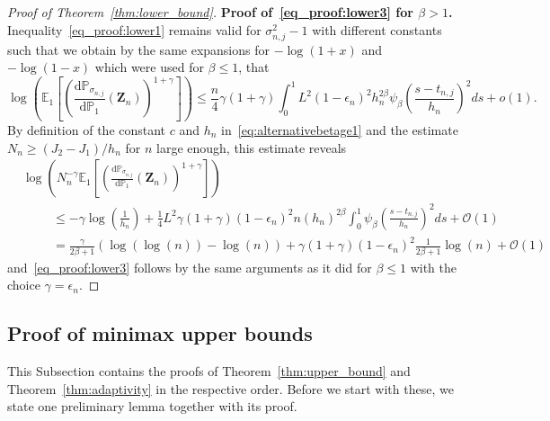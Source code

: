 \documentclass[10.5pt,letter]{article}
\numberwithin{equation}{section}
\theoremstyle{definition}
\newcommand{\E}{\mathbb{E}}
\renewcommand{\P}{\mathbb{P}}
\newcommand{\1}{\mathbbm{1}}
\begin{document}
\begin{proof}[Proof of Theorem~\ref{thm:lower_bound}]
\textbf{Proof of~\eqref{eq_proof:lower3} for $\beta> 1$.}
Inequality~\eqref{eq_proof:lower1} remains valid for $\sigma_{n,j}^2-1$ with different constants such that we obtain by the same expansions for $-\log(1+x)$ and $-\log(1-x)$ which were used for $\beta\leq 1$, that
\[ \log\left( \E_1 \left[\left(\frac{\textrm{d}\P_{\sigma_{n,j}}}{\textrm{d}\P_1}(\mathbf{Z}_n)\right)^{1+\gamma}\right] \right) \leq \frac{n}{4} \gamma(1+\gamma) \int_0^1 L^2(1-\epsilon_n)^2h_n^{2\beta}\psi_{\beta}\left(\frac{s-t_{n,j}}{h_n}\right)^2ds + o(1).\]
By definition of the constant $c$ and $h_n$ in~\eqref{eq:alternativebetage1} and the estimate $N_n\geq (J_2-J_1)/h_n$ for $n$ large enough, this estimate reveals
\begin{align*}
    &\log\left( N_n^{-\gamma}\E_1 \left[\left(\frac{\textrm{d}\P_{\sigma_{n,j}}}{\textrm{d}\P_1}(\mathbf{Z}_n)\right)^{1+\gamma}\right] \right)\\
     &\hspace{1cm}\leq -\gamma\log\left(\frac{1}{h_n}\right) + \frac14 L^2 \gamma(1+\gamma)(1-\epsilon_n)^2 n(h_n)^{2\beta} \int_0^1 \psi_\beta\left( \frac{s-t_{n,j}}{h_n}\right)^2 ds + \mathcal{O}(1)\\
    &\hspace{1cm} = \frac{\gamma}{2\beta+1}\left( \log(\log(n)) - \log(n)\right) + \gamma(1+\gamma)(1-\epsilon_n)^2 \frac{1}{2\beta+1} \log(n) + \mathcal{O}(1)
\end{align*}
and~\eqref{eq_proof:lower3} follows by the same arguments as it did for $\beta\leq 1$ with the choice $\gamma=\epsilon_n$.
\end{proof}

















\subsection{Proof of minimax upper bounds}\label{Subsection:Proof_upper_bound}
This Subsection contains the proofs of Theorem~\ref{thm:upper_bound} and Theorem~\ref{thm:adaptivity} in the respective order. Before we start with these, we state one preliminary lemma together with its proof.
\end{document}

